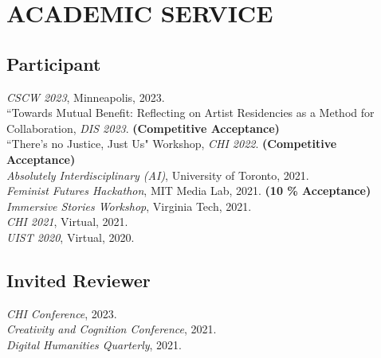  \section{ACADEMIC SERVICE}

 \subsection{Participant}
 \emph{CSCW 2023}, Minneapolis, 2023.\\
 ``Towards Mutual Benefit: Reflecting on Artist Residencies as a Method for Collaboration, \emph{DIS 2023}. \textbf{(Competitive Acceptance)}\\
``There's no Justice, Just Us" Workshop, \emph{CHI 2022}. \textbf{(Competitive Acceptance)}\\
\emph{Absolutely Interdisciplinary (AI)}, University of Toronto, 2021.\\
\emph{Feminist Futures Hackathon}, MIT Media Lab, 2021. \textbf{(10 \% Acceptance)}\\
\emph{Immersive Stories Workshop}, Virginia Tech, 2021.\\
\emph{CHI 2021}, Virtual, 2021. \\
\emph{UIST 2020}, Virtual, 2020. 

  \subsection{Invited Reviewer}
   \emph{CHI Conference}, 2023. \\
 \emph{Creativity and Cognition Conference}, 2021. \\
  \emph{Digital Humanities Quarterly}, 2021. \\